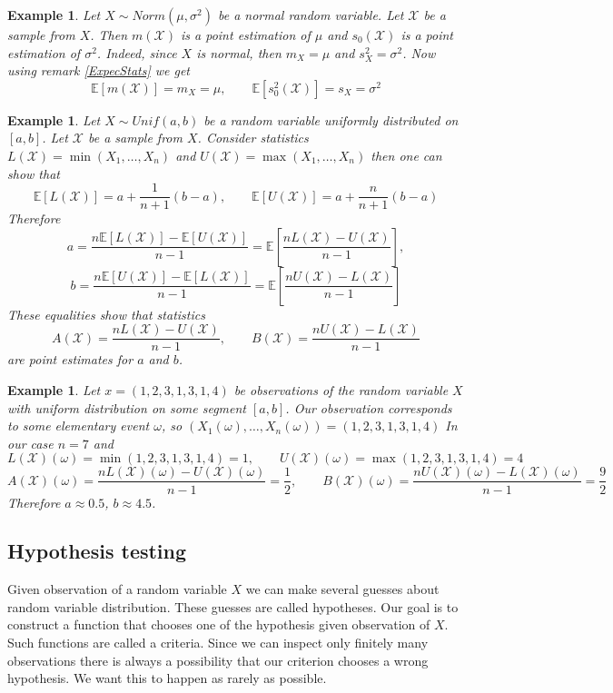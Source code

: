 \documentclass[12pt]{article}
\newtheorem{example}[theorem]{Example}
\begin{document}
\begin{example} Let $X\sim Norm(\mu,\sigma^2)$ be a normal random variable. Let $\mathscr{X}$ be a sample from $X$. Then $m(\mathscr{X})$ is a point estimation of $\mu$ and $s_{0}(\mathscr{X})$ is a point estimation of $\sigma^2$. Indeed, since $X$ is normal, then $m_X=\mu$ and $s_X^2=\sigma^2$. Now using remark \ref{ExpecStats} we get
$$
\mathbb{E}[m(\mathscr{X})]=m_X=\mu,
\quad\quad
\mathbb{E}[s_{0}^2(\mathscr{X})]=s_X=\sigma^2
$$
\end{example}

\begin{example} Let $X\sim Unif(a, b)$ be a random variable uniformly distributed on $[a, b]$. Let $\mathscr{X}$ be a sample from $X$. Consider statistics $L(\mathscr{X})=\min(X_1,\ldots,X_n)$ and $U(\mathscr{X})=\max(X_1,\ldots,X_n)$ then one can show that
$$
\mathbb{E}[L(\mathscr{X})]=a+\frac{1}{n+1}(b-a),
\quad\quad
\mathbb{E}[U(\mathscr{X})]=a+\frac{n}{n+1}(b-a)
$$
Therefore
$$
a=\frac{n\mathbb{E}[L(\mathscr{X})]-\mathbb{E}[U(\mathscr{X})]}{n-1}
=\mathbb{E}\left[\frac{n L(\mathscr{X})-U(\mathscr{X})}{n-1}\right],
$$
$$
b=\frac{n\mathbb{E}[U(\mathscr{X})]-\mathbb{E}[L(\mathscr{X})]}{n-1}
=\mathbb{E}\left[\frac{n U(\mathscr{X})-L(\mathscr{X})}{n-1}\right]
$$
These equalities show that statistics
$$
A(\mathscr{X})=\frac{n L(\mathscr{X})-U(\mathscr{X})}{n-1},
\quad\quad
B(\mathscr{X})=\frac{n U(\mathscr{X})-L(\mathscr{X})}{n-1}
$$
are point estimates for $a$ and $b$.
\end{example}

\begin{example} Let $x=(1,2,3,1,3,1,4)$ be observations of the random variable $X$ with uniform distribution on some segment $[a,b]$. Our observation corresponds to some elementary event $\omega$, so $(X_1(\omega),\ldots,X_n(\omega))=(1,2,3,1,3,1,4)$ In our case $n=7$ and 
$$
L(\mathscr{X})(\omega)=\min(1,2,3,1,3,1,4)=1,
\quad\quad
U(\mathscr{X})(\omega)=\max(1,2,3,1,3,1,4)=4
$$ 
$$
A(\mathscr{X})(\omega)=\frac{n L(\mathscr{X})(\omega)-U(\mathscr{X})(\omega)}{n-1}=\frac{1}{2},
\quad\quad
B(\mathscr{X})(\omega)=\frac{n U(\mathscr{X})(\omega)-L(\mathscr{X})(\omega)}{n-1}=\frac{9}{2}
$$
Therefore $a\approx 0.5$, $b\approx 4.5$.
\end{example}

\subsection{Hypothesis testing}

Given observation of a random variable $X$ we can make several guesses about random variable distribution. These guesses are called hypotheses. Our goal is to construct a function that chooses one of the hypothesis given observation of $X$. Such functions are called a criteria. Since we can inspect only finitely many observations there is always a possibility that our criterion chooses a wrong hypothesis. We want this to happen as rarely as possible.
\end{document}
